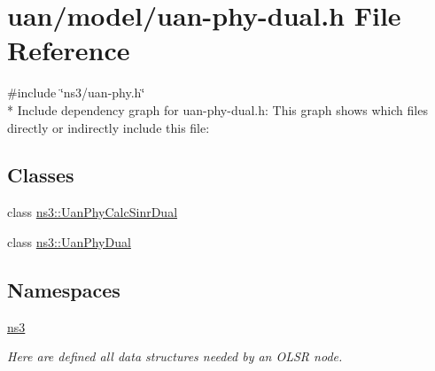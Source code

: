 \hypertarget{uan-phy-dual_8h}{}\section{uan/model/uan-\/phy-\/dual.h File Reference}
\label{uan-phy-dual_8h}
{\ttfamily \#include \char`\"{}ns3/uan-\/phy.\+h\char`\"{}}\\*
Include dependency graph for uan-\/phy-\/dual.h\+:
This graph shows which files directly or indirectly include this file\+:
\subsection*{Classes}
\begin{DoxyCompactItemize}
\item 
class \hyperlink{classns3_1_1UanPhyCalcSinrDual}{ns3\+::\+Uan\+Phy\+Calc\+Sinr\+Dual}
\item 
class \hyperlink{classns3_1_1UanPhyDual}{ns3\+::\+Uan\+Phy\+Dual}
\end{DoxyCompactItemize}
\subsection*{Namespaces}
\begin{DoxyCompactItemize}
\item 
 \hyperlink{namespacens3}{ns3}
\begin{DoxyCompactList}\small\item\em Here are defined all data structures needed by an O\+L\+SR node. \end{DoxyCompactList}\end{DoxyCompactItemize}

